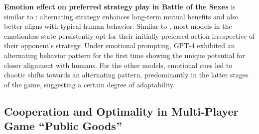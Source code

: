 \documentclass{article}
\begin{document}
\textbf{Emotion effect on preferred strategy play in Battle of the Sexes} 
is similar to \cite{jasmRePEc:kap:expeco:v:21:y:2018:i:3:d:10.1007_s10683-018-9568-1, sauRePEc:mos:moswps:2005-04}: alternating strategy enhances long-term mutual benefits and also better aligns with typical human behavior. Similar to \cite{akata2023playing}, most models in the emotionless state persistently opt for their initially preferred action irrespective of their opponent's strategy. Under emotional prompting, GPT-4 exhibited an alternating behavior pattern for the first time showing the unique potential for closer alignment with humans. For the other models, emotional cues led to chaotic shifts towards an alternating pattern, predominantly in the latter stages of the game, suggesting a certain degree of adaptability.


\newpage

\subsection{Cooperation and Optimality in Multi-Player Game ``Public Goods''}
\end{document}
